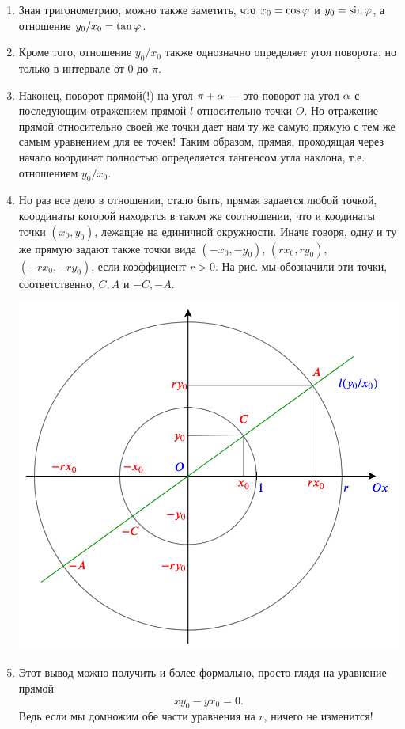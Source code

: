 \begin{enumerate}
\item Зная тригонометрию, можно также заметить, что $x_0=\cos\varphi$ и $y_0=\sin\varphi$, а отношение $y_0/x_0=\tan\varphi$.
\item Кроме того, отношение $y_0/x_0$ также однозначно определяет угол поворота, но только в интервале от 0 до $\pi$.
\item Наконец, поворот прямой(!) на угол $\pi+\alpha$ --- это поворот на угол $\alpha$ с последующим отражением прямой $l$ относительно точки $O$. Но отражение прямой относительно своей же точки дает нам ту же самую прямую с тем же самым уравнением для ее точек! Таким образом, прямая, проходящая через начало координат полностью определяется тангенсом угла наклона, т.е. отношением $y_0/x_0$.
\item Но раз все дело в отношении, стало быть, прямая задается любой точкой, координаты которой находятся в таком же соотношении, что и коодинаты точки $(x_0,y_0)$, лежащие на единичной окружности. Иначе говоря, одну и ту же прямую задают также точки вида $(-x_0,-y_0)$, $(rx_0,ry_0)$, $(-rx_0,-ry_0)$, если коэффициент $r>0$. На рис. мы обозначили эти точки, соответственно, $C,A$ и $-C,-A$.
\begin{center}
\includegraphics[scale=0.3]{line.png}
\end{center}
\item Этот вывод можно получить и более формально, просто глядя на уравнение прямой
$$
xy_0-yx_0=0.
$$
Ведь если мы домножим обе части уравнения на $r$, ничего не изменится!

\end{enumerate}

